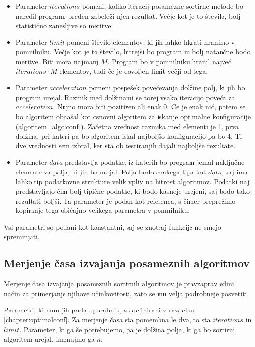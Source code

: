 \documentclass[a4paper,oneside,12pt]{article}
\begin{document}
\begin{itemize}
  \item Parameter $iterations$ pomeni, koliko iteracij posamezne sortirne metode bo naredil
    program, preden zabeleži njen rezultat. Večje kot je to število, bolj statistično
    zanesljive so meritve.
  \item Parameter $limit$ pomeni število elementov, ki jih lahko hkrati hranimo v pomnilniku.
    Večje kot je to število, hitrejši bo program in bolj natančne bodo meritve.
    Biti mora najmanj $M$\!. Program bo v
    pomnilniku hranil največ $iterations \cdot M$ elementov, tudi če je dovoljen limit večji od
    tega.
  \item Parameter $acceleration$ pomeni pospešek povečevanja dolžine polj, ki jih bo
    program urejal. Razmik med dolžinami se torej vsako iteracijo poveča za
    $acceleration$. Nujno mora biti pozitiven ali enak $0$. Če je enak nič, potem se bo
    algoritem obnašal kot osnovni algoritem za iskanje optimalne konfiguracije 
    (algoritem~\ref{algo:conf}). Začetna vrednost razmika med elementi je 1, prva dolžina,
    pri kateri pa bo algoritem iskal najboljšo konfiguracijo pa bo 4. Ti dve vrednosti sem
    izbral, ker sta ob testiranjih dajali najboljše rezultate.
  \item Parameter $data$ predstavlja podatke, iz katerih bo program jemal naključne
    elemente za polja, ki jih bo urejal. Polja bodo enakega tipa kot $data$, saj ima
    lahko tip podatkovne strukture velik vpliv na hitrost algoritmov. Podatki naj
    predstavljajo čim bolj tipične podatke, ki bodo kasneje urejeni, saj bodo tako
    rezultati boljši. Ta parameter je podan kot referenca, s čimer preprečimo kopiranje
    tega običajno velikega parametra v pomnilniku.
\end{itemize}
Vsi parametri so podani kot konstantni, saj se znotraj funkcije ne smejo spreminjati. 

\subsection{Merjenje časa izvajanja posameznih algoritmov}
Merjenje časa izvajanja posameznih sortirnih algoritmov je pravzaprav edini način za
primerjanje njihove učinkovitosti, zato se mu velja podrobneje posvetiti.

Parametri, ki nam jih poda uporabnik, so definirani v razdelku
\ref{chapter:optimalconf}. Za merjenje časa sta pomembna le dva, to sta $iterations$ in
$limit$. Parameter, ki ga še potrebujemo, pa je dolžina polja, ki ga bo sortirni algoritem
urejal, imenujmo ga $n$.
\end{document}
